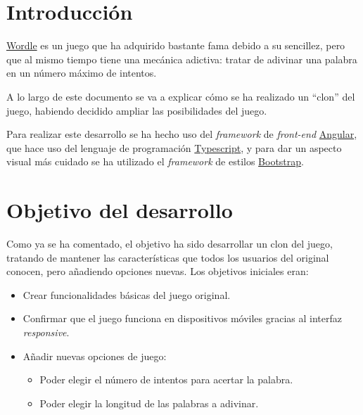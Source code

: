 \documentclass{\ClassPath/viu-tfm-template}
\begin{document}
    \graphicspath{{../../VIU_TFM_LaTeX_template/}}

    \coverpage

    \tableofcontents

\chapter{Introducción}

\href{https://www.nytimes.com/games/wordle/index.html}{Wordle} es un juego  que ha adquirido bastante fama debido a su sencillez, pero que al mismo tiempo tiene una mecánica adictiva: tratar de adivinar una palabra en un número máximo de intentos.

A lo largo de este documento se va a explicar cómo se ha realizado un “clon” del juego, habiendo decidido ampliar las posibilidades del juego.

Para realizar este desarrollo se ha hecho uso del \textit{framework} de \textit{front-end} \href{https://angular.io/}{Angular}, que hace uso del lenguaje de programación \href{https://www.typescriptlang.org/}{Typescript}, y para dar un aspecto visual más cuidado se ha utilizado el \textit{framework} de estilos \href{https://getbootstrap.com/}{Bootstrap}.

\chapter{Objetivo del desarrollo}

Como ya se ha comentado, el objetivo ha sido desarrollar un clon del juego, tratando de mantener las características que todos los usuarios del original conocen, pero añadiendo opciones nuevas. Los objetivos iniciales eran:

\vspace{-1em}
\begin{itemize}
    \item Crear funcionalidades básicas del juego original.
    \item Confirmar que el juego funciona en dispositivos móviles gracias al interfaz \textit{responsive}.
    \item Añadir nuevas opciones de juego:
    \begin{itemize}
        \item Poder elegir el número de intentos para acertar la palabra.
        \item Poder elegir la longitud de las palabras a adivinar.
    \end{itemize}
\end{itemize}
\vspace{-1em}
\end{document}
